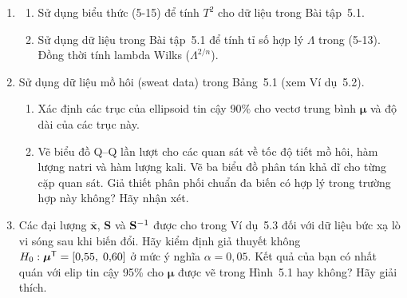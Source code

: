 \begin{enumerate}[label=\textbf{5.\arabic*.}, leftmargin=2.8em]
    \item
    \begin{enumerate}[label=(\alph*)]
        \item Sử dụng biểu thức (5-15) để tính $T^2$ cho dữ liệu trong Bài tập~5.1.
        \item Sử dụng dữ liệu trong Bài tập~5.1 để tính tỉ số hợp lý $\Lambda$ trong (5-13). Đồng thời tính lambda Wilks ($\Lambda^{2/n}$).
    \end{enumerate}

    \item Sử dụng dữ liệu mồ hôi (sweat data) trong Bảng~5.1 (xem Ví dụ~5.2).
    \begin{enumerate}[label=(\alph*)]
        \item Xác định các trục của ellipsoid tin cậy 90\% cho vectơ trung bình $\boldsymbol{\mu}$ và độ dài của các trục này.
        \item Vẽ biểu đồ Q--Q lần lượt cho các quan sát về tốc độ tiết mồ hôi, hàm lượng natri và hàm lượng kali. Vẽ ba biểu đồ phân tán khả dĩ cho từng cặp quan sát. Giả thiết phân phối chuẩn đa biến có hợp lý trong trường hợp này không? Hãy nhận xét.
    \end{enumerate}

    \item Các đại lượng $\overline{\mathbf{x}}$, $\mathbf{S}$ và $\mathbf{S}^{-1}$ được cho trong Ví dụ~5.3 đối với dữ liệu bức xạ lò vi sóng sau khi biến đổi. Hãy kiểm định giả thuyết không $H_0: \boldsymbol{\mu}^{\mathsf T} = [0{,}55,\; 0{,}60]$ ở mức ý nghĩa $\alpha = 0{,}05$. Kết quả của bạn có nhất quán với elip tin cậy 95\% cho $\boldsymbol{\mu}$ được vẽ trong Hình~5.1 hay không? Hãy giải thích.
\end{enumerate}
